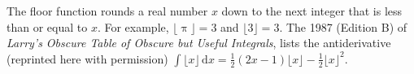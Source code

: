\documentclass[12pt,fleqn]{exam}
\begin{document}
\begin{questions}
\begin{parts}
     
\end{parts}

\newpage
 \question The floor function rounds a real number $x$ down to the 
 next integer that is less than or equal to $x$. For example, 
 $\lfloor \uppi \rfloor = 3$ and $\lfloor 3 \rfloor = 3$. The 
 1987 (Edition B) of \emph{Larry's Obscure Table of Obscure but 
 Useful Integrals}, lists the antiderivative
 (reprinted here with permission)
 $    \int  \lfloor x \rfloor  \, \mathrm{d} x = 
     \frac{1}{2} (2x -1) \lfloor x \rfloor - \frac{1}{2} \lfloor x \rfloor^2$.
  
\end{questions}
\end{document}
